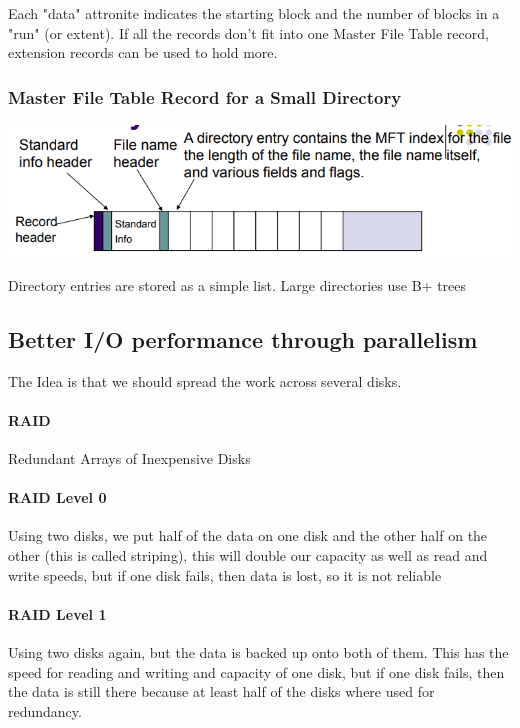 \documentclass{article}
\begin{document}
Each "data" attronite indicates the starting block and the number of blocks in a "run" (or extent). If all the records don't fit into one Master File Table record, extension records can be used to hold more.

\subsubsection{Master File Table Record for a Small Directory}

\includegraphics[scale=0.5]{yes4}

Directory entries are stored as a simple list. Large directories use B+ trees

\subsection{Better I\slash O performance through parallelism}

The Idea is that we should spread the work across several disks.

\paragraph{RAID} Redundant Arrays of Inexpensive Disks

\paragraph{RAID Level 0} Using two disks, we put half of the data on one disk and the other half on the other (this is called striping), this will double our capacity as well as read and write speeds, but if one disk fails, then data is lost, so it is not reliable

\paragraph{RAID Level 1} Using two disks again, but the data is backed up onto both of them. This has the speed for reading and writing and capacity of one disk, but if one disk fails, then the data is still there because at least half of the disks where used for redundancy.
\end{document}
